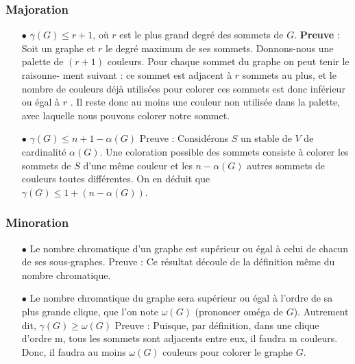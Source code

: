 \subsubsection*{Majoration}
\begin{itemize}
	\item[$\bullet$] $ \gamma (G) \leq r + 1 $, où $ r $ est le plus grand degré des sommets de $ G $.
\textbf{Preuve} : Soit un graphe et $ r $ le degré maximum de ses sommets. Donnons-nous une
palette de $ (r + 1) $ couleurs. Pour chaque sommet du graphe on peut tenir le raisonne-
ment suivant : ce sommet est adjacent à $ r $ sommets au plus, et le nombre de couleurs
déjà utilisées pour colorer ces sommets est donc inférieur ou égal à $ r $ . Il reste donc au
moins une couleur non utilisée dans la palette, avec laquelle nous pouvons colorer notre
sommet.
	\item[$\bullet$] $ \gamma (G) \leq n + 1 - \alpha (G) $
Preuve : Considérons $ S $ un stable de $ V $ de cardinalité $ \alpha (G) $. Une coloration possible
des sommets consiste à colorer les sommets de $ S $ d'une même couleur et les $ n - \alpha (G) $
autres sommets de couleurs toutes différentes. On en déduit que  \\ $ \gamma (G) \leq 1 + (n - \alpha (G)) $.
\end{itemize}

\subsubsection*{Minoration}
\begin{itemize}
\item[$ \bullet$]  Le nombre chromatique d'un graphe est supérieur ou égal à celui de chacun de ses
sous-graphes.
Preuve : Ce résultat découle de la définition même du nombre chromatique.
\item[$ \bullet $] Le nombre chromatique du graphe sera supérieur ou égal à l'ordre de sa plus grande
clique, que l'on note $ \omega (G) $ (prononcer oméga de $ G $). Autrement dit, $ \gamma (G) \geq \omega (G) $
Preuve : Puisque, par définition, dans une clique d'ordre m, tous les sommets sont
adjacents entre eux, il faudra m couleurs. Donc, il faudra au moins $ \omega (G) $ couleurs pour
colorer le graphe $ G $.
\end{itemize}

